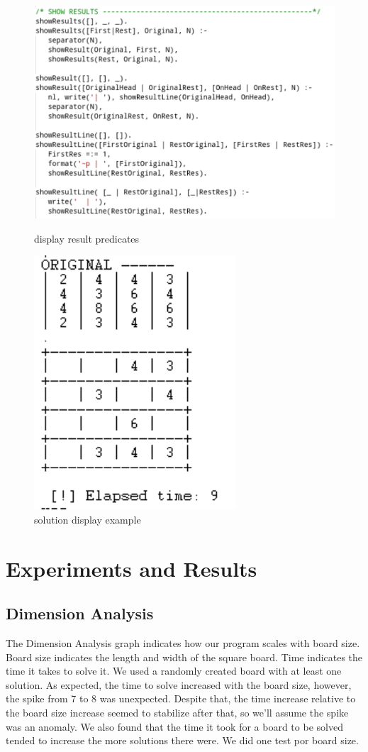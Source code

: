 \documentclass[runningheads]{llncs}
\begin{document}
\begin{figure}[h]
\includegraphics[scale=0.5]{showResults}
\centering
\caption{display result predicates}
\centering
\vspace{5mm}	
\includegraphics[scale=1]{solutionDisplay}
\centering
\caption{solution display example}
\centering
\end{figure}

\section{Experiments and Results}
\subsection{Dimension Analysis}
The Dimension Analysis graph indicates how our program scales with board size. Board size indicates the length and width of the square board.
Time indicates the time it takes to solve it.\hfill \break
We used a randomly created board with at least one solution.\hfill \break
As expected, the time to solve increased with the board size, however, the spike from 7 to 8 was unexpected. Despite that, the time increase relative to the board size increase seemed to stabilize after that, so we'll assume the spike was an anomaly.
We also found that the time it took for a board to be solved tended to increase the more solutions there were.\hfill \break
We did one test por board size.
\end{document}
